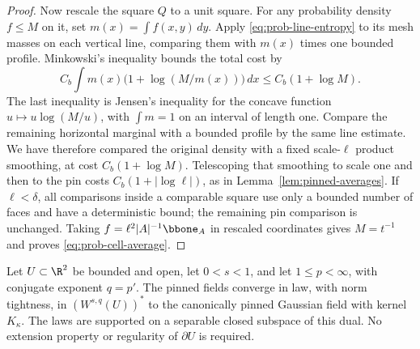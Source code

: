 \begin{proof}
Now rescale the square \(Q\) to a unit square. For any probability
density \(f\le M\) on it, set \(m(x)=\int f(x,y)\,dy\).
Apply \eqref{eq:prob-line-entropy} to its mesh masses on each vertical
line, comparing them with \(m(x)\) times one bounded profile.
Minkowski's inequality bounds the total cost by
\[
 C_b\int m(x)\bigl(1+\log(M/m(x))\bigr)\,dx
 \le C_b(1+\log M).
\]
The last inequality is Jensen's inequality for the concave function
\(u\mapsto u\log(M/u)\), with \(\int m=1\) on an interval of length
one. Compare the remaining horizontal marginal with a bounded profile
by the same line estimate. We have therefore compared the original
density with a fixed scale-\(\ell\) product smoothing, at cost
\(C_b(1+\log M)\). Telescoping that smoothing to scale one and then
to the pin costs \(C_b(1+|\log\ell|)\), as in
Lemma~\ref{lem:pinned-averages}.
If \(\ell<\delta\), all comparisons inside a comparable square use
only a bounded number of faces and have a deterministic bound; the
remaining pin comparison is unchanged. Taking
\(f=\ell^2|A|^{-1}\bbone_A\) in rescaled coordinates gives
\(M=t^{-1}\) and proves \eqref{eq:prob-cell-average}.
\end{proof}

\begin{proposition}\label{prop:intrinsic-dual}
Let \(U\subset\R^2\) be bounded and open, let \(0<s<1\), and let
\(1\le p<\infty\), with conjugate exponent \(q=p'\).
The pinned fields converge in law, with norm tightness, in
\((W^{s,q}(U))^*\) to the canonically pinned Gaussian field with kernel
\(K_\kappa\). The laws are supported on a separable closed subspace of
this dual. No extension property or regularity of \(\partial U\) is
required.
\end{proposition}

